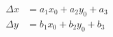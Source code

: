 \begin{equation}
    \label{eq:affine-model-direct-estimation}
    \begin{split}
        \Delta x &= a_1 x_0 + a_2 y_0 + a_3 \\
        \Delta y &= b_1 x_0 + b_2 y_0 + b_3
    \end{split}
\end{equation}